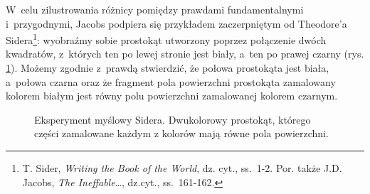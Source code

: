 W~celu zilustrowania różnicy pomiędzy prawdami fundamentalnymi i~przygodnymi, Jacobs podpiera się przykładem zaczerpniętym od Theodore'a Sidera\footnote{T. Sider, \textit{Writing the Book of the World}, dz. cyt., ss.~1-2. Por. także J.D. Jacobs, \textit{The Ineffable}\ldots, dz.cyt., ss.~161-162.}: wyobraźmy sobie prostokąt utworzony poprzez połączenie dwóch kwadratów, z~których ten po lewej stronie jest biały, a~ten po prawej czarny (rys. \ref{sil-jac-siderpic}). Możemy zgodnie z~prawdą stwierdzić, że połowa prostokąta jest biała, a~połowa czarna oraz że fragment pola powierzchni prostokąta zamalowany kolorem białym jest równy polu powierzchni zamalowanej kolorem czarnym.
\begin{figure}[H]
\begin{center}


\caption[Eksperyment myślowy Sidera]{Eksperyment myślowy Sidera. Dwukolorowy prostokąt, którego części zamalowane każdym z kolorów mają równe pola powierzchni.}\label{sil-jac-siderpic}
\end{center}
\end{figure}

